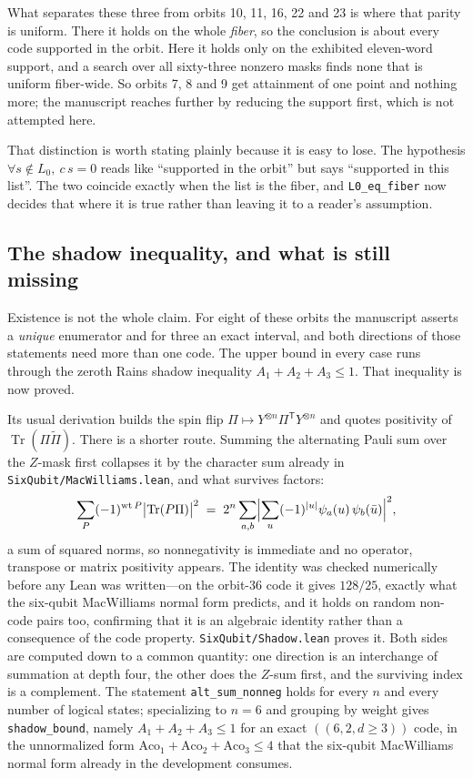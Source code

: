 \documentclass[11pt,a4paper]{article}
\newcommand{\lean}[1]{\texttt{#1}}
\theoremstyle{definition}
\begin{document}
What separates these three from orbits 10, 11, 16, 22 and 23 is where that
parity is uniform. There it holds on the whole \emph{fiber}, so the conclusion is
about every code supported in the orbit. Here it holds only on the exhibited
eleven-word support, and a search over all sixty-three nonzero masks finds none
that is uniform fiber-wide. So orbits 7, 8 and 9 get attainment of one point and
nothing more; the manuscript reaches further by reducing the support first, which
is not attempted here.

That distinction is worth stating plainly because it is easy to lose. The
hypothesis $\forall s\notin L_0,\ c\,s=0$ reads like ``supported in the orbit''
but says ``supported in this list''. The two coincide exactly when the list is
the fiber, and \lean{L0\_eq\_fiber} now decides that where it is true rather than
leaving it to a reader's assumption.

\subsection{The shadow inequality, and what is still missing}

Existence is not the whole claim. For eight of these orbits the manuscript
asserts a \emph{unique} enumerator and for three an exact interval, and both
directions of those statements need more than one code. The upper bound in
every case runs through the zeroth Rains shadow inequality
$A_1+A_2+A_3\le1$. That inequality is now proved.

Its usual derivation builds the spin flip
$\Pi\mapsto Y^{\otimes n}\Pi^{\mathsf T}Y^{\otimes n}$ and quotes positivity of
$\operatorname{Tr}(\Pi\widetilde\Pi)$. There is a shorter route. Summing the
alternating Pauli sum over the $Z$-mask first collapses it by the character sum
already in \lean{SixQubit/MacWilliams.lean}, and what survives factors:
\[
  \sum_{P}(-1)^{\mathrm{wt}\,P}\bigl|\operatorname{Tr}(P\Pi)\bigr|^2
  \;=\;
  2^{n}\sum_{a,b}\Bigl|\sum_{u}(-1)^{|u|}\psi_a(u)\,\psi_b(\bar u)\Bigr|^{2},
\]
a sum of squared norms, so nonnegativity is immediate and no operator,
transpose or matrix positivity appears. The identity was checked numerically
before any Lean was written---on the orbit-36 code it gives $128/25$, exactly
what the six-qubit MacWilliams normal form predicts, and it holds on random
non-code pairs too, confirming that it is an algebraic identity rather than a
consequence of the code property. \lean{SixQubit/Shadow.lean} proves it. Both sides are
computed down to a common quantity: one direction is an interchange of
summation at depth four, the other does the $Z$-sum first, and the surviving
index is a complement. The statement
\lean{alt\_sum\_nonneg} holds for every $n$ and every number of
logical states; specializing to $n=6$ and grouping by weight gives
\lean{shadow\_bound}, namely $A_1+A_2+A_3\le1$ for an exact
$((6,2,d\ge3))$ code, in the unnormalized form
$\mathrm{Aco}_1+\mathrm{Aco}_2+\mathrm{Aco}_3\le4$ that the six-qubit
MacWilliams normal form already in the development consumes.
\end{document}
